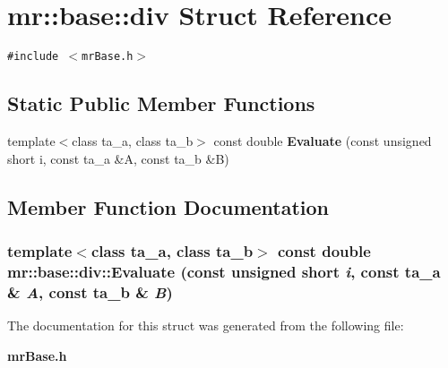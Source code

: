 \section{mr::base::div Struct Reference}
\label{structmr_1_1base_1_1div}
{\tt \#include $<$mr\-Base.h$>$}

\subsection*{Static Public Member Functions}
\begin{CompactItemize}
\item 
template$<$class ta\_\-a, class ta\_\-b$>$ const double {\bf Evaluate} (const unsigned short i, const ta\_\-a \&A, const ta\_\-b \&B)
\end{CompactItemize}


\subsection{Member Function Documentation}
\subsubsection{\setlength{\rightskip}{0pt plus 5cm}template$<$class ta\_\-a, class ta\_\-b$>$ const double mr::base::div::Evaluate (const unsigned short {\em i}, const ta\_\-a \& {\em A}, const ta\_\-b \& {\em B})\hspace{0.3cm}{\tt  [inline, static]}}\label{structmr_1_1base_1_1div_e0}




The documentation for this struct was generated from the following file:\begin{CompactItemize}
\item 
{\bf mr\-Base.h}\end{CompactItemize}
